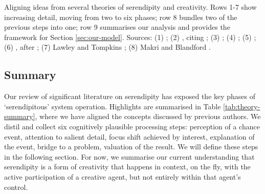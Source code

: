 \begin{table}
{\par}
\caption{Aligning ideas from several theories of serendipity and
  creativity.  Rows 1-7 show increasing detail, moving from two to six
  phases; row 8 bundles two of the previous steps
  into one; row 9 summarises our analysis and provides the framework for Section \ref{sec:our-model}.
  Sources:
  (1) \citet{andre2009discovery};
  (2) \citet{mckay-serendipity}, citing \citet{bergson1946creative};
  (3) \citet{csikszentmihalyi1997flow};
  (4) \citet{Allen:2013:LOD:2655780.2655790};
  (5) \citet{merton1948bearing};
  (6) \citet{csikszentmihalyi1997flow}, after \citet{wallas1926art};
  (7) Lawley and Tompkins \cite{lawley2008maximising};
  (8) Makri and Blandford \cite{Makri2012a}.
  \label{tab:theory-summary}}
\end{table}


\subsection{Summary} \label{sec:literature-summary}

Our review of significant literature on serendipity has exposed the
key phases of `serendipitous' system operation.  Highlights are
summarised in Table \ref{tab:theory-summary}, where we have aligned
the concepts discussed by previous authors.  We distil and collect six
cognitively plausible processing steps: perception of a chance event,
attention to salient detail, focus shift achieved by interest,
explanation of the event, bridge to a problem, valuation of the
result.  We will define these steps in the following section.  For
now, we summarise our current understanding that serendipity is a form
of creativity that happens in context, on the fly, with the active
participation of a creative agent, but not entirely within that
agent's control.

